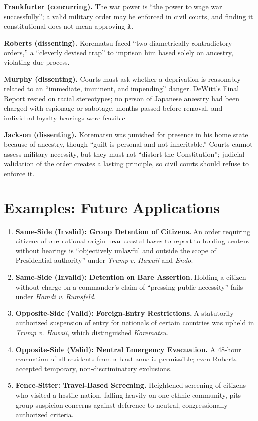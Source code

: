\documentclass[12pt]{article}
\begin{document}
\textbf{Frankfurter (concurring).} The war power is ``the power to wage war successfully''; a valid military order may be enforced in civil courts, and finding it constitutional does not mean approving it.

\textbf{Roberts (dissenting).} Korematsu faced ``two diametrically contradictory orders,'' a ``cleverly devised trap'' to imprison him based solely on ancestry, violating due process.

\textbf{Murphy (dissenting).} Courts must ask whether a deprivation is reasonably related to an ``immediate, imminent, and impending'' danger. DeWitt's Final Report rested on racial stereotypes; no person of Japanese ancestry had been charged with espionage or sabotage, months passed before removal, and individual loyalty hearings were feasible.

\textbf{Jackson (dissenting).} Korematsu was punished for presence in his home state because of ancestry, though ``guilt is personal and not inheritable.'' Courts cannot assess military necessity, but they must not ``distort the Constitution''; judicial validation of the order creates a lasting principle, so civil courts should refuse to enforce it.

\section{Examples: Future Applications}

\begin{enumerate}
\item \textbf{Same-Side (Invalid): Group Detention of Citizens.} An order requiring citizens of one national origin near coastal bases to report to holding centers without hearings is ``objectively unlawful and outside the scope of Presidential authority'' under \textit{Trump v. Hawaii} and \textit{Endo}.
\item \textbf{Same-Side (Invalid): Detention on Bare Assertion.} Holding a citizen without charge on a commander's claim of ``pressing public necessity'' fails under \textit{Hamdi v. Rumsfeld}.
\item \textbf{Opposite-Side (Valid): Foreign-Entry Restrictions.} A statutorily authorized suspension of entry for nationals of certain countries was upheld in \textit{Trump v. Hawaii}, which distinguished \textit{Korematsu}.
\item \textbf{Opposite-Side (Valid): Neutral Emergency Evacuation.} A 48-hour evacuation of all residents from a blast zone is permissible; even Roberts accepted temporary, non-discriminatory exclusions.
\item \textbf{Fence-Sitter: Travel-Based Screening.} Heightened screening of citizens who visited a hostile nation, falling heavily on one ethnic community, pits group-suspicion concerns against deference to neutral, congressionally authorized criteria.
\end{enumerate}
\end{document}
